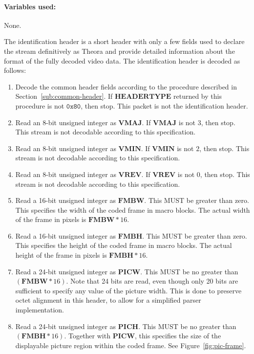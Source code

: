 \documentclass[11pt,letterpaper]{book}
\newcommand{\bitvar}[1]{\ensuremath{\mathbf{\bm #1}}}
\newcommand{\hex}[1]{\ensuremath{\mathtt{0x#1}}}
\numberwithin{equation}{chapter}
\numberwithin{figure}{chapter}
\numberwithin{table}{chapter}
\begin{document}
\paragraph{Variables used:} None.
\medskip

The identification header is a short header with only a few fields used to
 declare the stream definitively as Theora and provide detailed information
 about the format of the fully decoded video data.
The identification header is decoded as follows:

\begin{enumerate}
\item
Decode the common header fields according to the procedure described in
 Section~\ref{sub:common-header}.
If \bitvar{HEADERTYPE} returned by this procedure is not \hex{80}, then stop.
This packet is not the identification header.
\item
Read an 8-bit unsigned integer as \bitvar{VMAJ}.
If \bitvar{VMAJ} is not $3$, then stop.
This stream is not decodable according to this specification.
\item
Read an 8-bit unsigned integer as \bitvar{VMIN}.
If \bitvar{VMIN} is not $2$, then stop.
This stream is not decodable according to this specification.
\item
Read an 8-bit unsigned integer as \bitvar{VREV}.
If \bitvar{VREV} is not $0$, then stop.
This stream is not decodable according to this specification.
\item
Read a 16-bit unsigned integer as \bitvar{FMBW}.
This MUST be greater than zero.
This specifies the width of the coded frame in macro blocks.
The actual width of the frame in pixels is $\bitvar{FMBW}*16$.
\item
Read a 16-bit unsigned integer as \bitvar{FMBH}.
This MUST be greater than zero.
This specifies the height of the coded frame in macro blocks.
The actual height of the frame in pixels is $\bitvar{FMBH}*16$.
\item
Read a 24-bit unsigned integer as \bitvar{PICW}.
This MUST be no greater than $(\bitvar{FMBW}*16)$.
Note that 24 bits are read, even though only 20 bits are sufficient to specify
 any value of the picture width.
This is done to preserve octet alignment in this header, to allow for a
 simplified parser implementation.
\item
Read a 24-bit unsigned integer as \bitvar{PICH}.
This MUST be no greater than $(\bitvar{FMBH}*16)$.
Together with \bitvar{PICW}, this specifies the size of the displayable picture
 region within the coded frame.
See Figure~\ref{fig:pic-frame}.

\end{enumerate}
\end{document}
